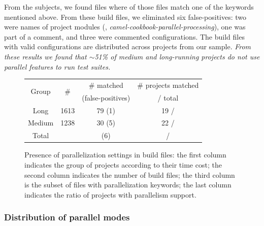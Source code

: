 From the \numMedLong{} subjects, we found \pomMedLong{} \pomf{} files
where \numPomMatched{} of those files match one of the keywords
mentioned above.  From these \numPomMatched{} build files, we
eliminated six false-positives: two were names of project modules
(\eg, \emph{camel-cookbook-parallel-processing}), one was part of a
comment, and three were commented configurations. The
\numPomMatchedValid{} build files with valid configurations are
distributed across \numProjectsPar{} projects from our sample.
\emph{From these results we found that $\sim$51\% of medium and
long-running projects do not use parallel features to run test
suites.}

\begin{figure}[ht!]
    \centering
    \begin{tabular*}{0.48\textwidth}{@{\extracolsep{\fill}}cccc}
        \toprule
        \multirow{2}{*}{Group} %
            & \multirow{2}{*}{\# \pomf{}}
            & \# \pomf{} matched
            & \# projects matched\\%
            & %
            & (false-positives)
            & / total\\%
        \midrule%
        Long   & 1613 & 79 (1) & 19 / \numLong{}\\%
        Medium & 1238 & 30 (5) & 22 / \numMed{}\\%
        \midrule%
        Total %
            & \pomMedLong{}
            & \numPomMatched{} (6)
            & \numProjectsPar{} / \numMedLong{}\\%
        \bottomrule%
    \end{tabular*}
    \caption{Presence of parallelization settings in build files: the
    first column indicates the group of projects according to their
    time cost; the second column indicates the number of build files;
    the third column is the subset of files with parallelization
    keywords; the last column indicates the ratio of projects with
    parallelism support.}
    \label{tab:inspection-table} 
\end{figure}

\subsubsection{  Distribution of parallel
modes}

